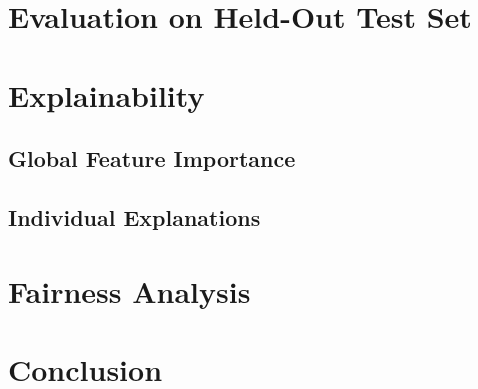 \documentclass[12pt, a4paper]{article}
\begin{document}
\section{Evaluation on Held-Out Test Set}

\section{Explainability}
\subsection{Global Feature Importance}

\subsection{Individual Explanations}

\section{Fairness Analysis}

\section{Conclusion}



\end{document}
